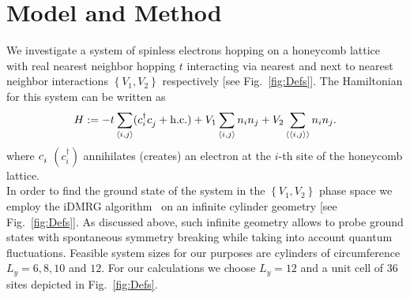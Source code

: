 \documentclass[aps,prx,10pt,twocolumn,floatfix,superscriptaddress,showpacs,numerical,footinbib]{revtex4-1}
\begin{document}
\section{\label{sec:modandmeth}Model and Method}
%
We investigate a system of spinless electrons hopping on a honeycomb lattice with real nearest neighbor hopping $t$ interacting via nearest and next to nearest neighbor interactions 
$\left\lbrace V_{1},V_{2}\right\rbrace$ respectively [see Fig.~\ref{fig:Defs}]. 
%
The Hamiltonian for this system can be written as
\begin{equation}
%
 H:=-t\sum_{\left\langle i,j\right\rangle}(c^{\dagger}_{i}c^{\vphantom{\dagger}}_{j}+ \mathrm{h.c.})+
V_{1}\sum_{\left\langle i,j\right\rangle }n_{i}n_{j}+
%
V_{2}\sum_{\left\langle \left\langle i,j\right\rangle \right\rangle }n_{i}n_{j}.
%
\label{eq:H}
\end{equation}
%
where $c_{i}^{\vphantom{\dagger}}$ $(c^{\dagger}_{i})$  annihilates (creates) an electron at the $i$-th site of the honeycomb lattice.\\
%
In order to find the ground state of the system in the $\left\lbrace V_{1},V_{2}\right\rbrace$ phase space
we employ the iDMRG algorithm~\cite{M08,W92,KZM13} on an infinite cylinder geometry [see Fig.~\ref{fig:Defs}].
%
As discussed above, such infinite geometry allows to probe ground states with spontaneous 
symmetry breaking while taking into account quantum fluctuations.
%
Feasible system sizes for our purposes are cylinders of circumference $L_{y} = 6,8,10$ and $12$.
%
For our calculations we choose $L_y=12$ and a unit cell of 36 sites depicted in Fig.~\ref{fig:Defs}.
%
%
\end{document}
